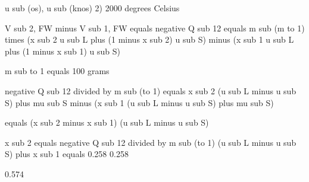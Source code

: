 u sub (os), u sub (knos) 2) 2000 degrees Celsius

V sub 2, FW minus V sub 1, FW equals negative Q sub 12 equals m sub (m to 1) times (x sub 2 u sub L plus (1 minus x sub 2) u sub S) minus (x sub 1 u sub L plus (1 minus x sub 1) u sub S) 

m sub to 1 equals 100 grams

negative Q sub 12 divided by m sub (to 1) equals x sub 2 (u sub L minus u sub S) plus mu sub S minus (x sub 1 (u sub L minus u sub S) plus mu sub S) 

equals (x sub 2 minus x sub 1) (u sub L minus u sub S)

x sub 2 equals negative Q sub 12 divided by m sub (to 1) (u sub L minus u sub S) plus x sub 1 equals 0.258 0.258

0.574